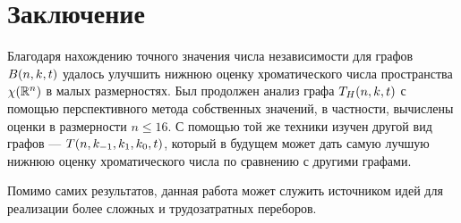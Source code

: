 \section{Заключение}
Благодаря нахождению точного значения числа независимости для графов $B(n,k,t)$
удалось улучшить нижнюю оценку хроматического числа пространства $\chi(\mathbb R^n)$
в малых размерностях.
Был продолжен анализ графа $T_H(n,k,t)$ с помощью перспективного метода
собственных значений, в частности, вычислены оценки в размерности $n \leq 16$.
С помощью той же техники изучен другой вид графов --- $T(n,k_{-1},k_1,k_0,t)$, который в будущем
может дать самую лучшую нижнюю оценку хроматического числа по сравнению с
другими графами.

Помимо самих результатов, данная работа может служить источником идей для
реализации более сложных и трудозатратных переборов.
